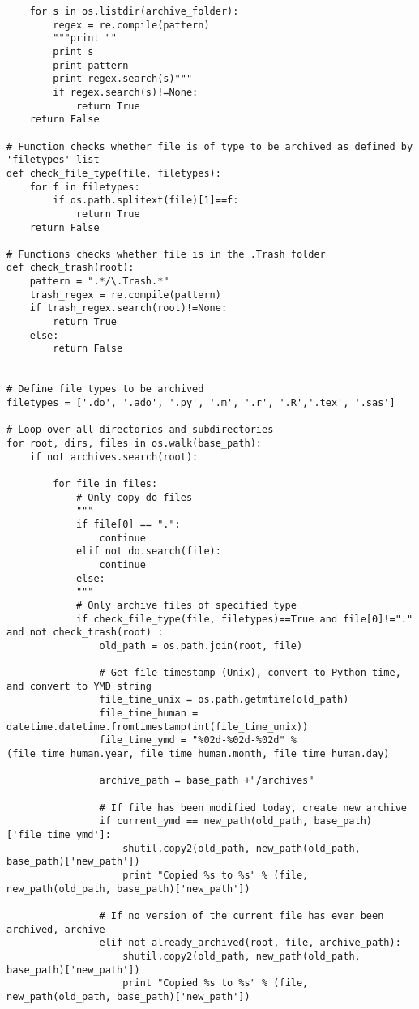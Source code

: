 \documentclass[11pt]{article}
\begin{document}
\begin{lstlisting}
    for s in os.listdir(archive_folder):
        regex = re.compile(pattern)
        """print ""
        print s
        print pattern
        print regex.search(s)"""
        if regex.search(s)!=None:
            return True
    return False

# Function checks whether file is of type to be archived as defined by 'filetypes' list
def check_file_type(file, filetypes):
    for f in filetypes:
        if os.path.splitext(file)[1]==f:
            return True
    return False

# Functions checks whether file is in the .Trash folder
def check_trash(root):
    pattern = ".*/\.Trash.*"
    trash_regex = re.compile(pattern)
    if trash_regex.search(root)!=None:
        return True
    else:
        return False


# Define file types to be archived
filetypes = ['.do', '.ado', '.py', '.m', '.r', '.R','.tex', '.sas']

# Loop over all directories and subdirectories
for root, dirs, files in os.walk(base_path):
    if not archives.search(root):

        for file in files:
            # Only copy do-files
            """
            if file[0] == ".":
                continue
            elif not do.search(file):
                continue
            else:
            """
            # Only archive files of specified type
            if check_file_type(file, filetypes)==True and file[0]!="." and not check_trash(root) :
                old_path = os.path.join(root, file)

                # Get file timestamp (Unix), convert to Python time, and convert to YMD string
                file_time_unix = os.path.getmtime(old_path)
                file_time_human = datetime.datetime.fromtimestamp(int(file_time_unix))
                file_time_ymd = "%02d-%02d-%02d" % (file_time_human.year, file_time_human.month, file_time_human.day)

                archive_path = base_path +"/archives"

                # If file has been modified today, create new archive
                if current_ymd == new_path(old_path, base_path)['file_time_ymd']:
                    shutil.copy2(old_path, new_path(old_path, base_path)['new_path'])
                    print "Copied %s to %s" % (file, new_path(old_path, base_path)['new_path'])

                # If no version of the current file has ever been archived, archive
                elif not already_archived(root, file, archive_path):
                    shutil.copy2(old_path, new_path(old_path, base_path)['new_path'])
                    print "Copied %s to %s" % (file, new_path(old_path, base_path)['new_path'])


\end{lstlisting}
\end{document}
